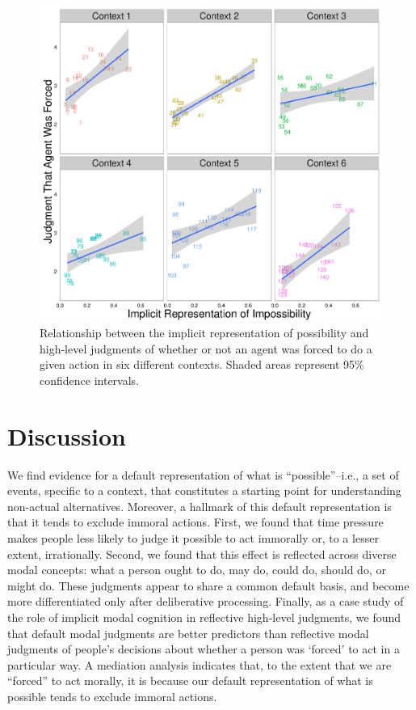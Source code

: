 \documentclass[9pt,twocolumn,twoside]{pnas-new}
\begin{document}
\begin{figure}%
\centering
\includegraphics[width=.9\linewidth]{fig5}
\caption{Relationship between the implicit representation of possibility and high-level judgments of whether or not an agent was forced to do a given action in six different contexts. Shaded areas represent 95\% confidence intervals.}
\label{fig:fig5}
\end{figure}

\section*{Discussion}

We find evidence for a default representation of what is ``possible''--i.e., a set of events, specific to a context, that constitutes a starting point for understanding non-actual alternatives. Moreover, a hallmark of this default representation is that it tends to exclude immoral actions.  First, we found that time pressure makes people less likely to judge it possible to act immorally or, to a lesser extent, irrationally. Second, we found that this effect is reflected across diverse modal concepts: what a person ought to do, may do, could do, should do, or might do. These judgments appear to share a common default basis, and become more differentiated only after deliberative processing. Finally, as a case study of the role of implicit modal cognition in reflective high-level judgments, we found that default modal judgments are better predictors than reflective modal judgments of people's decisions about whether a person was `forced' to act in a particular way. A mediation analysis indicates that, to the extent that we are ``forced'' to act morally, it is because our default representation of what is possible tends to exclude immoral actions.
\end{document}
